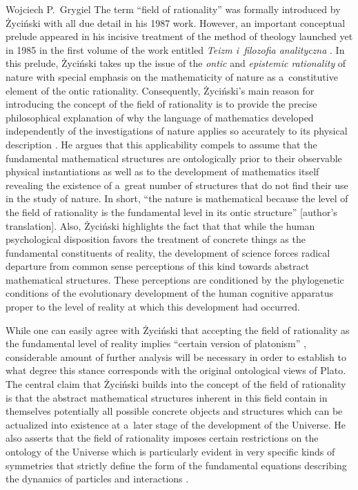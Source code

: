 \begin{artengenv}{Wojciech P.~Grygiel}
The term ``field of rationality'' was formally introduced by Życiński with all due detail in his 1987 work. However, an important conceptual prelude appeared in his incisive treatment of the method of theology launched yet in 1985 in the first volume of the work entitled \textit{Teizm i~filozofia analityczna}
\parencite[][pp.187–207]{zycinski_teizm_1985}. %
 In this prelude, Życiński takes up the issue of the \textit{ontic} and \textit{epistemic rationality} of nature with special emphasis on the mathematicity of nature as a~constitutive element of the ontic rationality. Consequently, Życiński's main reason for introducing the concept of the field of rationality is to provide the precise philosophical explanation of why the language of mathematics developed independently of the investigations of nature applies so accurately to its physical description 
\parencite[][]{zycinski_filozoficzne_1987}. %
 He argues that this applicability compels to assume that the fundamental mathematical structures are ontologically prior to their observable physical instantiations as well as to the development of mathematics itself revealing the existence of a~great number of structures that do not find their use in the study of nature. In short, ``the nature is mathematical because the level of the field of rationality is the fundamental level in its ontic structure'' 
\parencite[][p.176]{zycinski_filozoficzne_1987} %
 [author's translation]. Also, Życiński highlights the fact that that while the human psychological disposition favors the treatment of concrete things as the fundamental constituents of reality, the development of science forces radical departure from common sense perceptions of this kind towards abstract mathematical structures. These perceptions are conditioned by the phylogenetic conditions of the evolutionary development of the human cognitive apparatus proper to the level of reality at which this development had occurred.

While one can easily agree with Życiński that accepting the field of rationality as the fundamental level of reality implies ``certain version of platonism''
\parencite[][p.174]{zycinski_filozoficzne_1987}, %
 considerable amount of further analysis will be necessary in order to establish to what degree this stance corresponds with the original ontological views of Plato. The central claim that Życiński builds into the concept of the field of rationality is that the abstract mathematical structures inherent in this field contain in themselves potentially all possible concrete objects and structures which can be actualized into existence at a~later stage of the development of the Universe. He also asserts that the field of rationality imposes certain restrictions on the ontology of the Universe which is particularly evident in very specific kinds of symmetries that strictly define the form of the fundamental equations describing the dynamics of particles and interactions 
\parencite[][p.180]{zycinski_filozoficzne_1987}.%



\end{artengenv}
